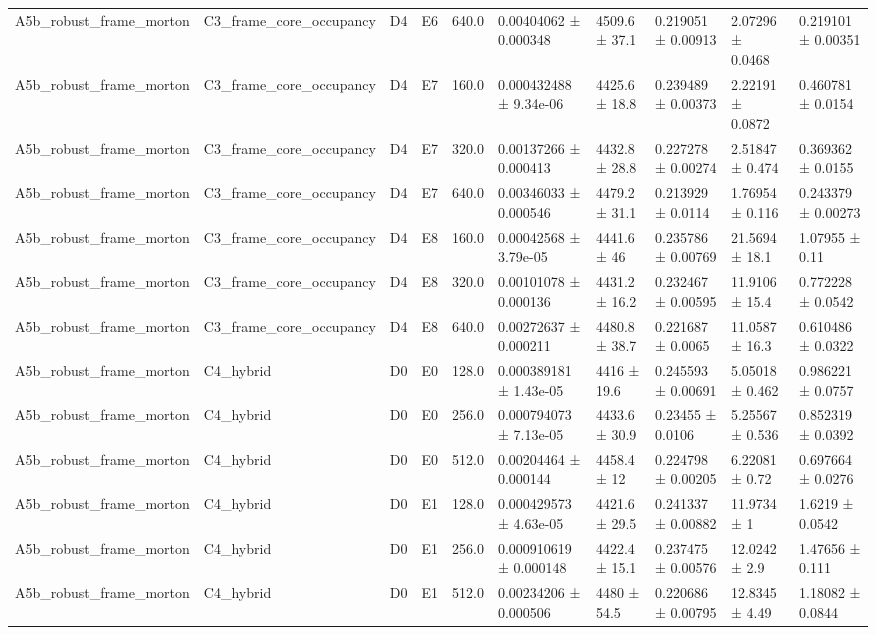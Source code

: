 \begin{table}
\begin{tabular}{llllllllll}
A5b\_robust\_frame\_morton & C3\_frame\_core\_occupancy & D4 & E6 & 640.0 & 0.00404062 ± 0.000348 & 4509.6 ± 37.1 & 0.219051 ± 0.00913 & 2.07296 ± 0.0468 & 0.219101 ± 0.00351 \\
A5b\_robust\_frame\_morton & C3\_frame\_core\_occupancy & D4 & E7 & 160.0 & 0.000432488 ± 9.34e-06 & 4425.6 ± 18.8 & 0.239489 ± 0.00373 & 2.22191 ± 0.0872 & 0.460781 ± 0.0154 \\
A5b\_robust\_frame\_morton & C3\_frame\_core\_occupancy & D4 & E7 & 320.0 & 0.00137266 ± 0.000413 & 4432.8 ± 28.8 & 0.227278 ± 0.00274 & 2.51847 ± 0.474 & 0.369362 ± 0.0155 \\
A5b\_robust\_frame\_morton & C3\_frame\_core\_occupancy & D4 & E7 & 640.0 & 0.00346033 ± 0.000546 & 4479.2 ± 31.1 & 0.213929 ± 0.0114 & 1.76954 ± 0.116 & 0.243379 ± 0.00273 \\
A5b\_robust\_frame\_morton & C3\_frame\_core\_occupancy & D4 & E8 & 160.0 & 0.00042568 ± 3.79e-05 & 4441.6 ± 46 & 0.235786 ± 0.00769 & 21.5694 ± 18.1 & 1.07955 ± 0.11 \\
A5b\_robust\_frame\_morton & C3\_frame\_core\_occupancy & D4 & E8 & 320.0 & 0.00101078 ± 0.000136 & 4431.2 ± 16.2 & 0.232467 ± 0.00595 & 11.9106 ± 15.4 & 0.772228 ± 0.0542 \\
A5b\_robust\_frame\_morton & C3\_frame\_core\_occupancy & D4 & E8 & 640.0 & 0.00272637 ± 0.000211 & 4480.8 ± 38.7 & 0.221687 ± 0.0065 & 11.0587 ± 16.3 & 0.610486 ± 0.0322 \\
A5b\_robust\_frame\_morton & C4\_hybrid & D0 & E0 & 128.0 & 0.000389181 ± 1.43e-05 & 4416 ± 19.6 & 0.245593 ± 0.00691 & 5.05018 ± 0.462 & 0.986221 ± 0.0757 \\
A5b\_robust\_frame\_morton & C4\_hybrid & D0 & E0 & 256.0 & 0.000794073 ± 7.13e-05 & 4433.6 ± 30.9 & 0.23455 ± 0.0106 & 5.25567 ± 0.536 & 0.852319 ± 0.0392 \\
A5b\_robust\_frame\_morton & C4\_hybrid & D0 & E0 & 512.0 & 0.00204464 ± 0.000144 & 4458.4 ± 12 & 0.224798 ± 0.00205 & 6.22081 ± 0.72 & 0.697664 ± 0.0276 \\
A5b\_robust\_frame\_morton & C4\_hybrid & D0 & E1 & 128.0 & 0.000429573 ± 4.63e-05 & 4421.6 ± 29.5 & 0.241337 ± 0.00882 & 11.9734 ± 1 & 1.6219 ± 0.0542 \\
A5b\_robust\_frame\_morton & C4\_hybrid & D0 & E1 & 256.0 & 0.000910619 ± 0.000148 & 4422.4 ± 15.1 & 0.237475 ± 0.00576 & 12.0242 ± 2.9 & 1.47656 ± 0.111 \\
A5b\_robust\_frame\_morton & C4\_hybrid & D0 & E1 & 512.0 & 0.00234206 ± 0.000506 & 4480 ± 54.5 & 0.220686 ± 0.00795 & 12.8345 ± 4.49 & 1.18082 ± 0.0844 \\

\end{tabular}
\end{table}
